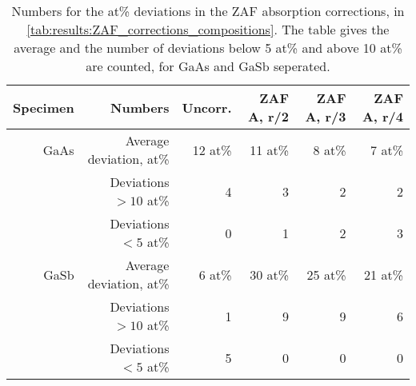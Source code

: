 \begin{table}[phtb]
    \begin{center}
        \caption{
            Numbers for the at\% deviations in the ZAF absorption corrections, in \cref{tab:results:ZAF_corrections_compositions}.
            The table gives the average and the number of deviations below 5 at\% and above 10 at\% are counted, for GaAs and GaSb seperated.
        }
        \label{tab:results:ZAF_corrections_compositions_stats}
        \begin{tabular}{rrrrrr}
            \hline
            \textbf{Specimen} & \textbf{Numbers}        & \textbf{Uncorr.} & \textbf{ZAF A, r/2} & \textbf{ZAF A, r/3} & \textbf{ZAF A, r/4} \\
            \hline

            GaAs              & Average deviation, at\% & 12 at\%          & 11 at\%             & 8 at\%              & 7 at\%              \\
                              & Deviations $>10$ at\%   & 4                & 3                   & 2                   & 2                   \\
                              & Deviations  $<5$  at\%  & 0                & 1                   & 2                   & 3                   \\
            \hline
            GaSb              & Average deviation, at\% & 6 at\%           & 30 at\%             & 25 at\%             & 21 at\%             \\
                              & Deviations $>10$ at\%   & 1                & 9                   & 9                   & 6                   \\
                              & Deviations  $<5$  at\%  & 5                & 0                   & 0                   & 0                   \\

            \hline
        \end{tabular}
    \end{center}
\end{table}
